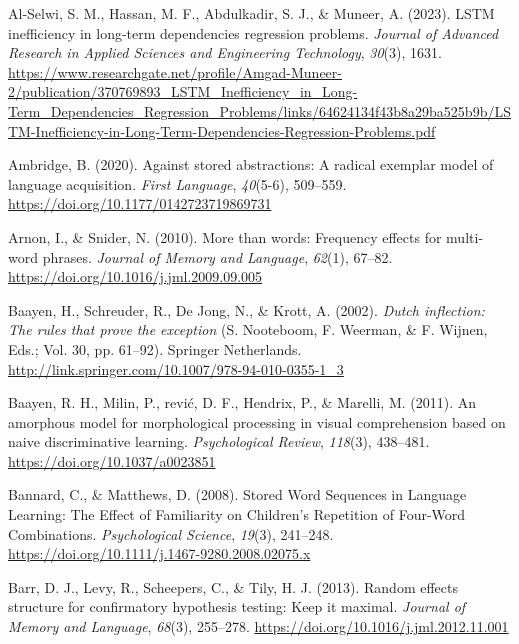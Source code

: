 \documentclass[
  12pt,
  letterpaper,
]{scrreprt}
\newlength{\cslhangindent}
\newenvironment{CSLReferences}[2] %
 {\begin{list}{}{%
  \setlength{\itemindent}{0pt}
  \setlength{\leftmargin}{0pt}
  \setlength{\parsep}{0pt}
  \ifodd #1
   \setlength{\leftmargin}{\cslhangindent}
   \setlength{\itemindent}{-1\cslhangindent}
  \fi
  \setlength{\itemsep}{#2\baselineskip}}}
 {\end{list}}
\begin{document}
\label{refs}
\begin{CSLReferences}{1}{0}
Al-Selwi, S. M., Hassan, M. F., Abdulkadir, S. J., \& Muneer, A. (2023).
LSTM inefficiency in long-term dependencies regression problems.
\emph{Journal of Advanced Research in Applied Sciences and Engineering
Technology}, \emph{30}(3), 1631.
\url{https://www.researchgate.net/profile/Amgad-Muneer-2/publication/370769893_LSTM_Inefficiency_in_Long-Term_Dependencies_Regression_Problems/links/64624134f43b8a29ba525b9b/LSTM-Inefficiency-in-Long-Term-Dependencies-Regression-Problems.pdf}

Ambridge, B. (2020). Against stored abstractions: A radical exemplar
model of language acquisition. \emph{First Language}, \emph{40}(5-6),
509--559. \url{https://doi.org/10.1177/0142723719869731}

Arnon, I., \& Snider, N. (2010). More than words: Frequency effects for
multi-word phrases. \emph{Journal of Memory and Language}, \emph{62}(1),
67--82. \url{https://doi.org/10.1016/j.jml.2009.09.005}

Baayen, H., Schreuder, R., De Jong, N., \& Krott, A. (2002). \emph{Dutch
inflection: The rules that prove the exception} (S. Nooteboom, F.
Weerman, \& F. Wijnen, Eds.; Vol. 30, pp. 61--92). Springer Netherlands.
\url{http://link.springer.com/10.1007/978-94-010-0355-1_3}

Baayen, R. H., Milin, P., rević, D. F., Hendrix, P., \& Marelli, M.
(2011). An amorphous model for morphological processing in visual
comprehension based on naive discriminative learning.
\emph{Psychological Review}, \emph{118}(3), 438--481.
\url{https://doi.org/10.1037/a0023851}

Bannard, C., \& Matthews, D. (2008). Stored Word Sequences in Language
Learning: The Effect of Familiarity on Children's Repetition of
Four-Word Combinations. \emph{Psychological Science}, \emph{19}(3),
241--248. \url{https://doi.org/10.1111/j.1467-9280.2008.02075.x}

Barr, D. J., Levy, R., Scheepers, C., \& Tily, H. J. (2013). Random
effects structure for confirmatory hypothesis testing: Keep it maximal.
\emph{Journal of Memory and Language}, \emph{68}(3), 255--278.
\url{https://doi.org/10.1016/j.jml.2012.11.001}


\end{CSLReferences}
\end{document}
